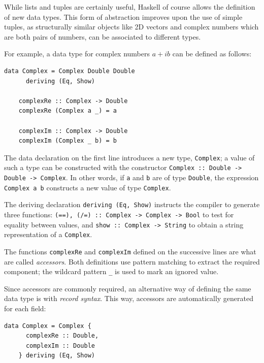 \documentclass[UdineBachThesis,american,11pt]{PhdThesis}
\begin{document}
  While lists and tuples are certainly useful, Haskell of course allows the
  definition of new data types. This form of abstraction improves upon the use
  of simple tuples, as structurally similar objects like 2D vectors and complex
  numbers which are both pairs of numbers, can be associated to different types.

  For example, a data type for complex numbers \mbox{$a + i b$} can be defined
  as follows:

  \begin{Verbatim}[gobble=4,fontsize=\small]
    data Complex = Complex Double Double
      deriving (Eq, Show)

    complexRe :: Complex -> Double
    complexRe (Complex a _) = a

    complexIm :: Complex -> Double
    complexIm (Complex _ b) = b
  \end{Verbatim}

  The data declaration on the first line introduces a new type,
  \mbox{\texttt{Complex}}; a value of such a type can be constructed with the
  constructor \mbox{\texttt{Complex :: Double -> Double -> Complex}}. In other
  words, if \texttt{a} and \texttt{b} are of type \mbox{\texttt{Double}}, the
  expression \mbox{\texttt{Complex a b}} constructs a new value of type
  \mbox{\texttt{Complex}}.

  The deriving declaration \mbox{\texttt{deriving (Eq, Show)}} instructs the
  compiler to generate three functions:
  \mbox{\texttt{(==), (/=) :: Complex -> Complex -> Bool}} to test for equality
  between values, and \mbox{\texttt{show :: Complex -> String}} to obtain a
  string representation of a \mbox{\texttt{Complex}}.

  The functions \mbox{\texttt{complexRe}} and \mbox{\texttt{complexIm}} defined
  on the successive lines are what are called \emph{accessors}. Both definitions
  use pattern matching to extract the required component; the wildcard pattern
  \texttt{\_} is used to mark an ignored value.

  Since accessors are commonly required, an alternative way of defining the same
  data type is with \emph{record syntax}. This way, accessors are automatically
  generated for each field:

  \begin{Verbatim}[gobble=4,fontsize=\small]
    data Complex = Complex {
      complexRe :: Double,
      complexIm :: Double
    } deriving (Eq, Show)
  \end{Verbatim}
\end{document}
